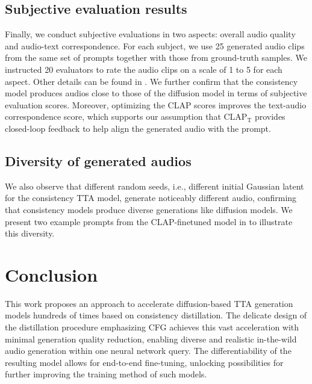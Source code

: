 \documentclass{article}
\newcommand{\CLAPT}{\text{CLAP}_\text{T}}
\begin{document}
\subsection{Subjective evaluation results}

Finally, we conduct subjective evaluations in two aspects: overall audio quality and audio-text correspondence. For each subject, we use 25 generated audio clips from the same set of prompts together with those from ground-truth samples. We instructed 20 evaluators to rate the audio clips on a scale of 1 to 5 for each aspect. Other details can be found in . We further confirm that the consistency model produces audios close to those of the diffusion model in terms of subjective evaluation scores. Moreover, optimizing the CLAP scores improves the text-audio correspondence score, which supports our assumption that $\CLAPT$ provides closed-loop feedback to help align the generated audio with the prompt.


\subsection{Diversity of generated audios}

We also observe that different random seeds, i.e., different initial Gaussian latent for the consistency TTA model, generate noticeably different audio, confirming that consistency models produce diverse generations like diffusion models. We present two example prompts from the CLAP-finetuned model in  to illustrate this diversity.



\section{Conclusion}

This work proposes an approach to accelerate diffusion-based TTA generation models hundreds of times based on consistency distillation. The delicate design of the distillation procedure emphasizing CFG achieves this vast acceleration with minimal generation quality reduction, enabling diverse and realistic in-the-wild audio generation within one neural network query. The differentiability of the resulting model allows for end-to-end fine-tuning, unlocking possibilities for further improving the training method of such models.


\newpage




\appendix
\onecolumn
\newpage
\end{document}

